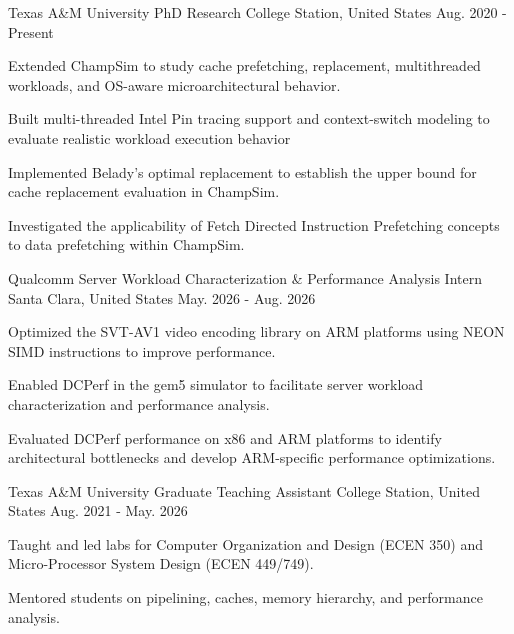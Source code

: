 
\begin{cventries}

    \cventry
    {Texas A\&M University} %
    {PhD Research} %
    {College Station, United States} %
    {Aug. 2020 - Present} %
    {
      \begin{cvitems} %
        \item {Extended ChampSim to study cache prefetching, replacement, multithreaded workloads, and OS-aware microarchitectural behavior.}
        \item {Built multi-threaded Intel Pin tracing support and context-switch modeling to evaluate
        realistic workload execution behavior}
        \item {Implemented Belady's optimal replacement to establish the upper bound for cache replacement evaluation in ChampSim.}    
        \item {Investigated the applicability of Fetch Directed Instruction Prefetching concepts to data prefetching within ChampSim.}
      \end{cvitems}
    }

    \cventry
    {Qualcomm} %
    {Server Workload Characterization \& Performance Analysis Intern} %
    {Santa Clara, United States} %
    {May. 2026 - Aug. 2026} %
    {
      \begin{cvitems} %
        \item {Optimized the SVT-AV1 video encoding library on ARM platforms using NEON SIMD instructions to improve performance.}
        \item {Enabled DCPerf in the gem5 simulator to facilitate server workload characterization and performance analysis.}
        \item {Evaluated DCPerf performance on x86 and ARM platforms to identify architectural bottlenecks and develop ARM-specific performance optimizations.}    
      \end{cvitems}
    }
    
    \cventry
    {Texas A\&M University} %
    {Graduate Teaching Assistant} %
    {College Station, United States} %
    {Aug. 2021 - May. 2026} %
    {
      \begin{cvitems} %
        \item {Taught and led labs for Computer Organization and Design (ECEN 350) and Micro-Processor System Design (ECEN 449/749).}
        \item {Mentored students on pipelining, caches, memory hierarchy, and performance analysis.}
      \end{cvitems}
    }
    

\end{cventries}
